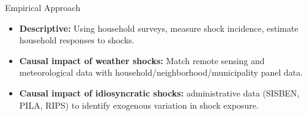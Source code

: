 \documentclass[aspectratio = 169]{beamer}
\begin{document}
  \begin{frame}{Empirical Approach}
	\begin{itemize}
	  \item \textbf{Descriptive:} Using household surveys, measure shock incidence, estimate household responses to shocks.
	  \bigskip 
	  
	  \item \textbf{Causal impact of weather shocks:} Match remote sensing and meteorological data with household/neighborhood/municipality panel data. 	
	  \bigskip 

	  \item \textbf{Causal impact of idiosyncratic shocks:}  administrative data (SISBEN, PILA, RIPS) to identify exogenous variation in shock exposure.
	\end{itemize}
  \end{frame}
\end{document}
